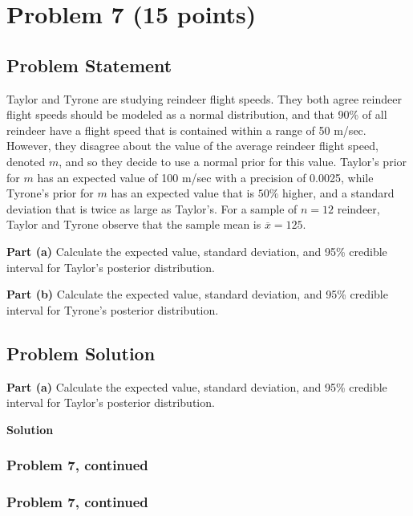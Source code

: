 \documentclass[12pt]{article}
\theoremstyle{definition}
\begin{document}
\newpage
\section*{Problem 7 (15 points)}

\subsection*{Problem Statement}

Taylor and Tyrone are studying reindeer flight speeds. They both agree reindeer flight speeds should be modeled as a normal distribution, and that 90\% of all reindeer have a flight speed that is contained within a range of 50 m/sec. However, they disagree about the value of the average reindeer flight speed, denoted $m$, and so they decide to use a normal prior for this value. Taylor's prior for $m$ has an expected value of 100 m/sec with a precision of 0.0025, while Tyrone's prior for $m$ has an expected value that is $50\%$ higher, and a standard deviation that is twice as large as Taylor's. For a sample of $n = 12$ reindeer, Taylor and Tyrone observe that the sample mean is $\overline{x} = 125$.

\bigskip
\noindent
{\bf Part (a)} Calculate the expected value, standard deviation, and 95\% credible interval for Taylor's posterior distribution.

\bigskip
\noindent
{\bf Part (b)} Calculate the expected value, standard deviation, and 95\% credible interval for Tyrone's posterior distribution.


\subsection*{Problem Solution}

\bigskip
\noindent
{\bf Part (a)} Calculate the expected value, standard deviation, and 95\% credible interval for Taylor's posterior distribution.

\bigskip
\noindent
{\bf Solution}



\newpage
\subsubsection*{Problem 7, continued}


\newpage
\subsubsection*{Problem 7, continued}
\end{document}
